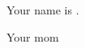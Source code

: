 \documentclass[char]{guildcamp1}
\begin{document}
\name{\cKid{}}

Your name is \cKid{\they}.

\begin{contacts}
  \contact{\cScientist{}} Your mom 
\end{contacts}
\end{document}
